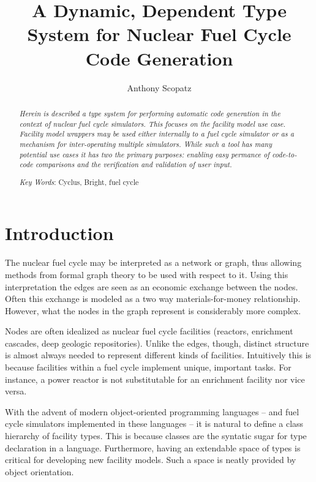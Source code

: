 \documentclass{ansconfpaper}
\begin{document}
\lstset{language=Python}

\title{A Dynamic, Dependent Type System for Nuclear Fuel Cycle Code Generation}

\author{Anthony Scopatz}

\maketitle

\begin{abstract}
\textit{
Herein is described a type system for performing automatic code generation
in the context of nuclear fuel cycle simulators.  This focuses on the 
facility model use case.  Facility model wrappers may be used either internally
to a fuel cycle simulator or as a mechanism for inter-operating multiple simulators.
While such a tool has many potential use cases it has two the primary purposes:
enabling easy permance of code-to-code comparisons and the verification and 
validation of user input.
}

\emph{Key Words}: Cyclus, Bright, fuel cycle
\end{abstract}


\section{Introduction}
\label{sec:intro}
The nuclear fuel cycle may be interpreted as a network or graph, thus 
allowing methods from formal graph theory \cite{DIE05B} to be used with 
respect to it.  Using this interpretation the edges are seen as an economic exchange 
between the nodes.  Often this exchange is modeled as a two way materials-for-money 
relationship.  However, what the nodes in the graph represent is considerably 
more complex.  

Nodes are often idealized as nuclear fuel cycle facilities (reactors, enrichment
cascades, deep geologic repositories).  Unlike the edges, though, distinct structure
is almost always needed to represent different kinds of facilities.  Intuitively 
this is because facilities within a fuel cycle implement unique, important 
tasks.  For instance, a power reactor is not substitutable for an enrichment facility
nor vice versa.  

With the advent of modern object-oriented programming languages -- and fuel cycle
simulators implemented in these languages -- it is natural to define a class 
hierarchy of facility types.  This is because classes are the syntatic sugar for type 
declaration in a language.  Furthermore, having an extendable space of types is 
critical for developing new facility models.  Such a space is neatly provided by 
object orientation.
\end{document}
